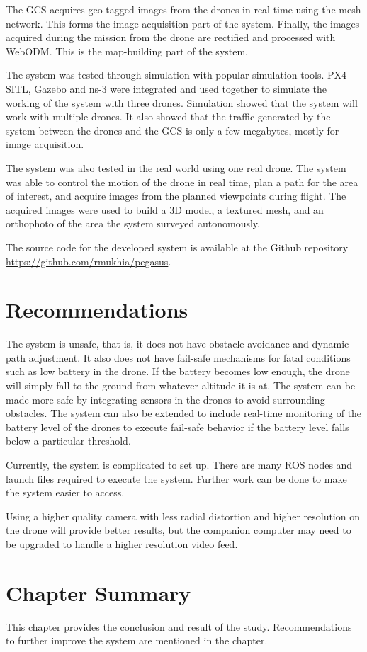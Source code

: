 The GCS acquires geo-tagged images from the drones in real time using the mesh network. This forms the image acquisition part of the system. 
Finally, the images acquired during the mission from the drone are rectified and processed with WebODM. This is the map-building part of the system.

The system was tested through simulation with popular simulation tools. PX4 SITL, Gazebo and ns-3 were integrated and used together to simulate the working of the system with three drones. Simulation showed that the system will work with multiple drones. It also showed that the traffic generated by the system between the drones and the GCS is only a few megabytes, mostly for image acquisition. 

The system was also tested in the real world using one real drone. The system was able to control the motion of the drone in real time, plan a path for the area of interest, and acquire images from the planned viewpoints during flight. The acquired images were used to build a 3D model, a textured mesh, and an orthophoto of the area the system surveyed autonomously. 

The source code for the developed system is available at the Github repository \\  \url{https://github.com/rmukhia/pegasus}.
\section{Recommendations}

The system is unsafe, that is, it does not have obstacle avoidance and dynamic path adjustment. It also does not have fail-safe mechanisms for fatal conditions such as low battery in the drone. If the battery becomes low enough, the drone will simply fall to the ground from whatever altitude it is at. The system can be made more safe by integrating sensors in the drones to avoid surrounding obstacles. The system can also be extended to include real-time monitoring of the battery level of the drones to execute fail-safe behavior if the battery level falls below a particular threshold.

Currently, the system is complicated to set up. There are many ROS nodes and launch files required to execute the system. Further work can be done to make the system easier to access.

Using a higher quality camera with less radial distortion and higher resolution on the drone will provide better results, but the companion computer may need to be upgraded to handle a higher resolution video feed.


\section{Chapter Summary}
This chapter provides the conclusion and result of the study. Recommendations to further improve the system are mentioned in the chapter.

\FloatBarrier
